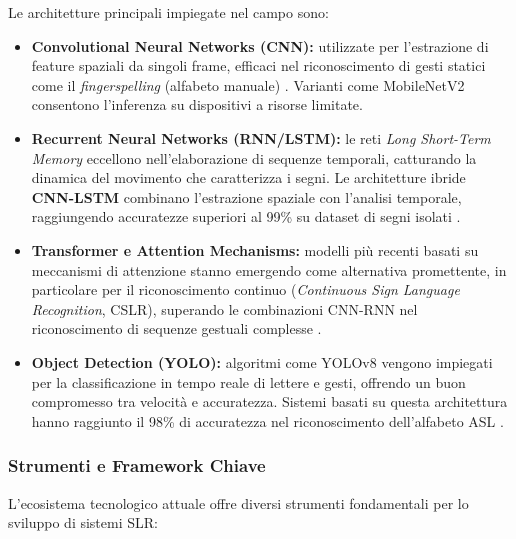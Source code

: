 Le architetture principali impiegate nel campo sono:

\begin{itemize}
    \item \textbf{Convolutional Neural Networks (CNN):} utilizzate per l'estrazione di feature spaziali da singoli frame, efficaci nel riconoscimento di gesti statici come il \textit{fingerspelling} (alfabeto manuale) \cite{lecun2015deeplearning}. Varianti come MobileNetV2 \cite{sandler2018mobilenetv2} consentono l'inferenza su dispositivi a risorse limitate.

    \item \textbf{Recurrent Neural Networks (RNN/LSTM):} le reti \textit{Long Short-Term Memory} \cite{hochreiter1997lstm} eccellono nell'elaborazione di sequenze temporali, catturando la dinamica del movimento che caratterizza i segni. Le architetture ibride \textbf{CNN-LSTM} combinano l'estrazione spaziale con l'analisi temporale, raggiungendo accuratezze superiori al 99\% su dataset di segni isolati \cite{kumar2024slr}.

    \item \textbf{Transformer e Attention Mechanisms:} modelli più recenti basati su meccanismi di attenzione \cite{vaswani2017attention} stanno emergendo come alternativa promettente, in particolare per il riconoscimento continuo (\textit{Continuous Sign Language Recognition}, CSLR), superando le combinazioni CNN-RNN nel riconoscimento di sequenze gestuali complesse \cite{rastgoo2024slrsurvey}.

    \item \textbf{Object Detection (YOLO):} algoritmi come YOLOv8 \cite{ultralytics2023yolov8} vengono impiegati per la classificazione in tempo reale di lettere e gesti, offrendo un buon compromesso tra velocità e accuratezza. Sistemi basati su questa architettura hanno raggiunto il 98\% di accuratezza nel riconoscimento dell'alfabeto ASL \cite{alrashidi2024asl}.
\end{itemize}

\subsubsection{Strumenti e Framework Chiave}

L'ecosistema tecnologico attuale offre diversi strumenti fondamentali per lo sviluppo di sistemi SLR:

